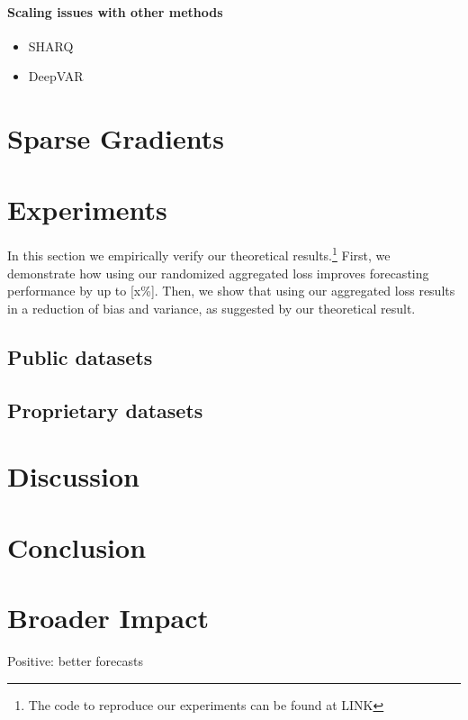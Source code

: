 \documentclass{article}
\begin{document}
\paragraph{Scaling issues with other methods}
\begin{itemize}
  \item SHARQ
  \item DeepVAR
\end{itemize}

\section{Sparse Gradients}


\section{Experiments}
  \label{sec:experiments}
  In this section we empirically verify our theoretical results.\footnote{The code to reproduce our experiments can be found at LINK} First, we demonstrate how using our randomized aggregated loss improves forecasting performance by up to [x\%]. Then, we show that using our aggregated loss results in a reduction of bias and variance, as suggested by our theoretical result.

  \subsection{Public datasets}
    \label{subsec:publicdatasets}

  \subsection{Proprietary datasets}
    \label{subsec:proprietarydatasets}

\section{Discussion}
  \label{sec:discussion}


\section{Conclusion}
  \label{sec:conclusion}


\section*{Broader Impact}

  Positive: better forecasts
\end{document}
